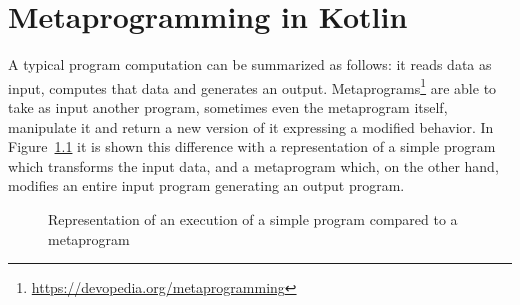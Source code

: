 \chapter{Metaprogramming in Kotlin}\label{chapter:metaprogramming}
A typical program computation can be summarized as follows: it reads data as input, computes that data and generates an output.\newline
Metaprograms\footnote{\url{https://devopedia.org/metaprogramming}} are able to take as input another program, sometimes even the metaprogram itself, manipulate it and return a new version of it expressing a modified behavior.\newline 
In Figure~\ref{fig:programming_vs_metaprogramming} it is shown this difference with a representation of a simple program which transforms the input data, and a metaprogram which, on the other hand, modifies an entire input program generating an output program.
\begin{figure}[ht!]
    \centering
    \qquad
    \caption{Representation of an execution of a simple program compared to a metaprogram}
    \label{fig:programming_vs_metaprogramming}
\end{figure}

